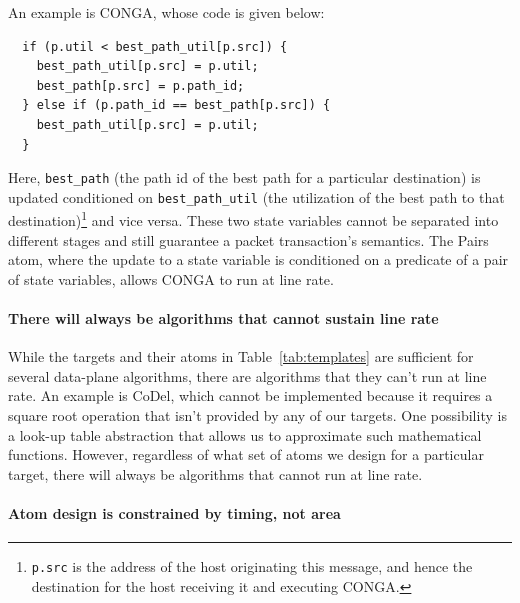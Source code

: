 An example is CONGA, whose code is given below:
\begin{verbatim}
  if (p.util < best_path_util[p.src]) {
    best_path_util[p.src] = p.util;
    best_path[p.src] = p.path_id;
  } else if (p.path_id == best_path[p.src]) {
    best_path_util[p.src] = p.util;
  }
\end{verbatim}
Here, \texttt{best\_path} (the path id of the best path for a particular
destination) is updated conditioned on \texttt{best\_path\_util} (the
utilization of the best path to that destination)\footnote{{\tt p.src} is the
  address of the host originating this message, and hence the destination for
the host receiving it and executing CONGA.} and vice versa. These two state
variables cannot be separated into different stages and still guarantee a
packet transaction's semantics. The Pairs atom, where the update to a state
variable is conditioned on a predicate of a pair of state variables, allows
CONGA to run at line rate.

\paragraph{There will always be algorithms that cannot sustain line rate}

While the targets and their atoms in Table~\ref{tab:templates} are sufficient
for several data-plane algorithms, there are algorithms that they can't run at
line rate.  An example is CoDel, which cannot be implemented because it
requires a square root operation that isn't provided by any of our targets. One
possibility is a look-up table abstraction that allows us to approximate such
mathematical functions. However, regardless of what set of atoms we design for
a particular target, there will always be algorithms that cannot run at line
rate.


\paragraph{Atom design is constrained by timing, not area}

